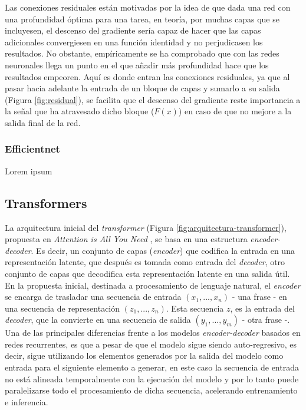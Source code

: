 Las conexiones residuales están motivadas por la idea de que dada una red con una profundidad óptima para una tarea, en teoría, por muchas capas que se incluyesen, el descenso del gradiente sería capaz de hacer que las capas adicionales convergiesen en una función identidad y no perjudicasen los resultados. No obstante, empíricamente se ha comprobado que con las redes neuronales llega un punto en el que añadir más profundidad hace que los resultados empeoren. Aquí es donde entran las conexiones residuales, ya que al pasar hacia adelante la entrada de un bloque de capas y sumarlo a su salida (Figura \ref{fig:residual}), se facilita que el descenso del gradiente reste importancia a la señal que ha atravesado dicho bloque ($F(x)$) en caso de que no mejore a la salida final de la red.



\subsubsection{Efficientnet}
Lorem ipsum

\subsection{Transformers}
La arquitectura inicial del \textit{transformer} (Figura \ref{fig:arquitectura-transformer}), propuesta en \textit{Attention is All You Need} \cite{NIPS2017_3f5ee243}, se basa en una estructura \textit{encoder-decoder}. Es decir, un conjunto de capas (\textit{encoder}) que codifica la entrada en una representación latente, que después es tomada como entrada del \textit{decoder}, otro conjunto de capas que decodifica esta representación latente en una salida útil. En la propuesta inicial, destinada a procesamiento de lenguaje natural, el \textit{encoder} se encarga de trasladar una secuencia de entrada $(x_1, ..., x_n)$ - una frase - en una secuencia de representación $(z_1, ..., z_n)$. Esta secuencia $z$, es la entrada del \textit{decoder}, que la convierte en una secuencia de salida $(y_1, ..., y_m)$ - otra frase -. Una de las principales diferencias frente a los modelos \textit{encoder-decoder} basados en redes recurrentes, es que a pesar de que el modelo sigue siendo auto-regresivo, es decir, sigue utilizando los elementos generados por la salida del modelo como entrada para el siguiente elemento a generar, en este caso la secuencia de entrada no está alineada temporalmente con la ejecución del modelo y por lo tanto puede paralelizarse todo el procesamiento de dicha secuencia, acelerando entrenamiento e inferencia.


